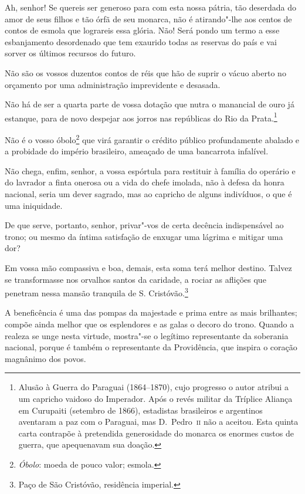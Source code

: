  Ah, senhor! Se quereis ser generoso para com esta nossa pátria, tão
deserdada do amor de seus filhos e tão órfã de seu monarca, não é
atirando"-lhe aos centos de contos de esmola que lograreis essa
glória. Não! Será pondo um termo a esse esbanjamento desordenado que
tem exaurido todas as reservas do país e vai sorver os últimos recursos
do futuro.

 Não são os vossos duzentos contos de réis que hão de suprir o vácuo
aberto no orçamento por uma administração imprevidente e desasada. 

 Não há de ser a quarta parte de vossa dotação que nutra o manancial de
ouro já estanque, para de novo despejar aos jorros nas repúblicas do
Rio da Prata.\footnote{ Alusão à Guerra do Paraguai (1864--1870), cujo progresso o autor
atribui a um capricho vaidoso do Imperador. Após o revés militar da
Tríplice Aliança em Curupaiti (setembro de 1866), estadistas brasileiros e argentinos 
aventaram a paz com o Paraguai, mas D.~Pedro~\textsc{ii} não a aceitou. Esta
quinta carta contrapõe à pretendida generosidade do monarca os enormes
custos de guerra, que apequenavam sua doação.}
 
Não é o vosso óbolo\footnote{ \textit{Óbolo}: moeda de pouco valor; esmola.}
 que virá garantir o crédito público profundamente abalado e a probidade
do império brasileiro, ameaçado de uma bancarrota infalível. 

 Não chega, enfim, senhor, a vossa espórtula para restituir à família do
operário e do lavrador a finta onerosa ou a vida do chefe imolada, não
à defesa da honra nacional, seria um dever sagrado, mas ao capricho de
alguns indivíduos, o que é uma iniquidade. 

 De que serve, portanto, senhor, privar"-vos de certa decência
indispensável ao trono; ou mesmo da íntima satisfação de enxugar uma
lágrima e mitigar uma dor? 

 Em vossa mão compassiva e boa, demais, esta soma terá melhor destino.
Talvez se transformasse nos orvalhos santos da caridade, a rociar as
aflições que penetram nessa mansão tranquila de S.
Cristóvão.\footnote{ Paço de São Cristóvão, residência imperial.}
 

 A beneficência é uma das pompas da majestade e prima entre as mais
brilhantes; compõe ainda melhor que os esplendores e as galas o decoro
do trono. Quando a realeza se unge nesta virtude, mostra"-se o
legítimo representante da soberania nacional, porque é também o
representante da Providência, que inspira o coração magnânimo dos povos. 

